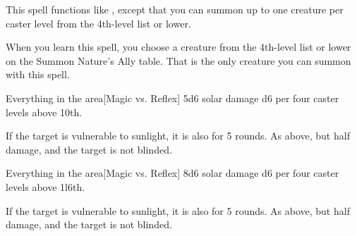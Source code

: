 \begin{spellheader}
    \spelldur{\durshort \dismissable}
\end{spellheader}
\begin{spelleffects}
    \spelleffect This spell functions like , except that you can summon up to one creature per caster level from the 4th-level list or lower.
    \par When you learn this spell, you choose a creature from the 4th-level list or lower on the Summon Nature's Ally table. That is the only creature you can summon with this spell.
\end{spelleffects}
\begin{spellfooter}
    
\end{spellfooter}

\begin{spellheader}
\end{spellheader}
\begin{spelleffects}
    \begin{spelltarget}{Everything in the area}[Magic vs. Reflex]
        \spellsuccess 5d6 solar damage \add d6 per four caster levels above 10th.

        If the target is vulnerable to sunlight, it is also \blinded for 5 rounds.
        \spellfailure As above, but half damage, and the target is not blinded.
    \end{spelltarget}
\end{spelleffects}
\begin{spellfooter}
    
\end{spellfooter}

\begin{spellheader}
\end{spellheader}
\begin{spelleffects}
    \begin{spelltarget}{Everything in the area}[Magic vs. Reflex]
        \spellsuccess 8d6 solar damage \add d6 per four caster levels above 1l6th.

        If the target is vulnerable to sunlight, it is also \blinded for 5 rounds.
        \spellfailure As above, but half damage, and the target is not blinded.
    \end{spelltarget}
\end{spelleffects}
\begin{spellfooter}
    
\end{spellfooter}

